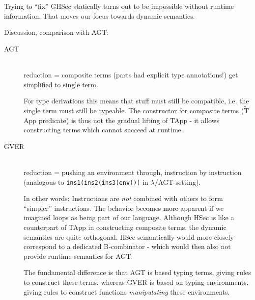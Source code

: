 \documentclass[11pt,a4paper]{article}
\newcommand{\grad}[1]{\widetilde{#1}}
\newcommand{\ttt}{\texttt}
\begin{document}
Trying to “fix” GHSec statically turns out to be impossible without runtime information. That moves our focus towards dynamic semantics. 

Discussion, comparison with AGT:
\begin{description}
	\item [AGT]~\\
	reduction = composite terms (parts had explicit type annotations!) get simplified to single term.
	
	For type derivations this means that stuff must still be compatible, i.e. the single term must still be typeable.
	The constructor for composite terms ($\grad{\text{T}}$App predicate) is thus not the gradual lifting of TApp - it allows constructing terms which cannot succeed at runtime.
	
	\item [GVER]~\\
	reduction = pushing an environment through, instruction by instruction (analogous to \ttt{ins1(ins2(ins3(env)))} in $\lambda$/AGT-setting).
	
	In other words: Instructions are \textit{not} combined with others to form “simpler” instructions.
	The behavior becomes more apparent if we imagined loops as being part of our language.
	Although HSec is like a counterpart of TApp in constructing composite terms, the dynamic semantics are quite orthogonal.
	HSec semantically would more closely correspond to a dedicated B-combinator - which would then also not provide runtime semantics for AGT.
	
	The fundamental difference is that AGT is based typing terms, giving rules to construct these terms, whereas GVER is based on typing environments, giving rules to construct functions \textit{manipulating} these environments.
	

\end{description}
\end{document}
